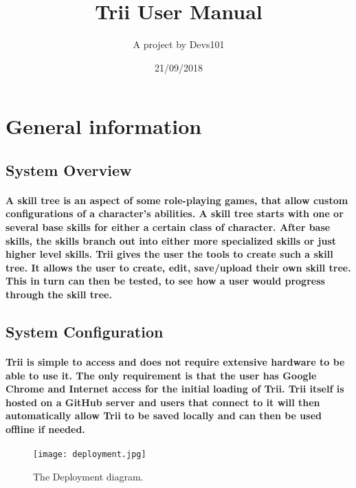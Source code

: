 \documentclass[12pt]{article}
\title{Trii User Manual}
\author{A project by Devs101}
\date{21/09/2018}
\begin{document}
\maketitle
\newpage
{}

\tableofcontents
\newpage

\section{General information}

\subsection{System Overview}
\paragraph{A skill tree is an aspect of some role-playing games, that allow custom configurations of a character's abilities. A skill tree starts with one or several base skills for either a certain class of character. After base skills, the skills branch out into either more specialized skills or just higher level skills. Trii gives the user the tools to create such a skill tree. It allows the user to create, edit, save/upload their own skill tree. This in turn can then be tested, to see how a user would progress through the skill tree.}

\subsection{System Configuration}
\paragraph{Trii is simple to access and does not require extensive hardware to be able to use it. The only requirement is that the user has Google Chrome and Internet access for the initial loading of Trii. Trii itself is hosted on a GitHub server and users that connect to it will then automatically allow Trii to be saved locally and can then be used offline if needed.}

\begin{figure}
  \texttt{[image: deployment.jpg]}
  \caption{The Deployment diagram.}
  \label{fig:deployment}
\end{figure}

\newpage
\end{document}
